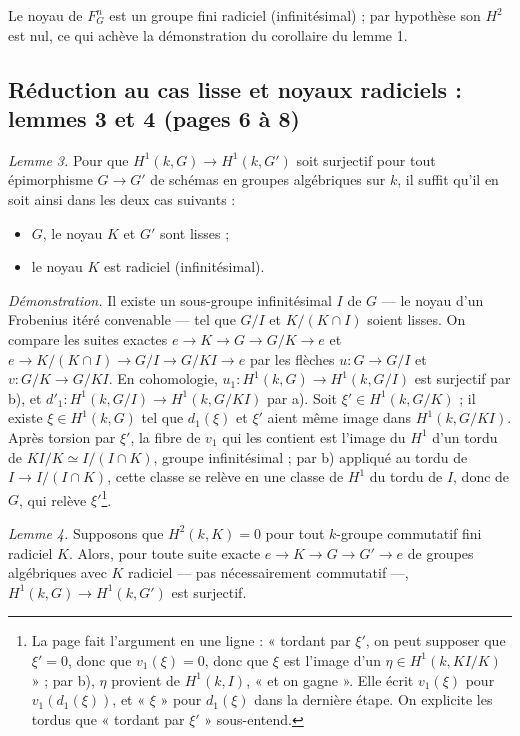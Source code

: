 \documentclass[11pt,a4paper]{article}
\begin{document}
Le noyau de $F^n_G$ est un groupe fini radiciel (infinitésimal) ; par
hypothèse son $H^2$ est nul, ce qui achève la démonstration du corollaire du
lemme 1.

\subsection*{Réduction au cas lisse et noyaux radiciels : lemmes 3 et 4 (pages 6 à 8)}

\emph{Lemme 3.} Pour que $H^1(k,G) \to H^1(k,G')$ soit surjectif pour tout
épimorphisme $G \to G'$ de schémas en groupes algébriques sur $k$, il suffit
qu'il en soit ainsi dans les deux cas suivants :
\begin{itemize}
\item[a)] $G$, le noyau $K$ et $G'$ sont lisses ;
\item[b)] le noyau $K$ est radiciel (infinitésimal).
\end{itemize}

\emph{Démonstration.} Il existe un sous-groupe infinitésimal $I$ de $G$ — le
noyau d'un Frobenius itéré convenable — tel que $G/I$ et $K/(K \cap I)$ soient
lisses. On compare les suites exactes $e \to K \to G \to G/K \to e$ et
$e \to K/(K \cap I) \to G/I \to G/KI \to e$ par les flèches $u : G \to G/I$ et
$v : G/K \to G/KI$. En cohomologie, $u_1 : H^1(k,G) \to H^1(k,G/I)$ est surjectif
par b), et $d'_1 : H^1(k,G/I) \to H^1(k,G/KI)$ par a). Soit
$\xi' \in H^1(k,G/K)$ ; il existe $\xi \in H^1(k,G)$ tel que $d_1(\xi)$ et
$\xi'$ aient même image dans $H^1(k,G/KI)$. Après torsion par $\xi'$, la fibre
de $v_1$ qui les contient est l'image du $H^1$ d'un tordu de
$KI/K \simeq I/(I \cap K)$, groupe infinitésimal ; par b) appliqué au tordu de
$I \to I/(I \cap K)$, cette classe se relève en une classe de $H^1$ du tordu de
$I$, donc de $G$, qui relève $\xi'$\footnote{La page fait l'argument en une
ligne : « tordant par $\xi'$, on peut supposer que $\xi' = 0$, donc que
$v_1(\xi) = 0$, donc que $\xi$ est l'image d'un $\eta \in H^1(k, KI/K)$ » ; par
b), $\eta$ provient de $H^1(k,I)$, « et on gagne ». Elle écrit $v_1(\xi)$ pour
$v_1(d_1(\xi))$, et « $\xi$ » pour $d_1(\xi)$ dans la dernière étape. On
explicite les tordus que « tordant par $\xi'$ » sous-entend.}.

\emph{Lemme 4.} Supposons que $H^2(k,K) = 0$ pour tout $k$-groupe commutatif
fini radiciel $K$. Alors, pour toute suite exacte $e \to K \to G \to G' \to e$
de groupes algébriques avec $K$ radiciel — pas nécessairement commutatif —,
$H^1(k,G) \to H^1(k,G')$ est surjectif.
\end{document}
